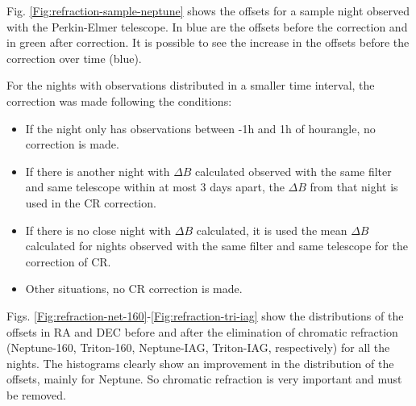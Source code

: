 \documentclass[12pt,a4paper]{report}
\newcommand{\PE}{Perkin-Elmer }
\newcommand{\BC}{Boller \& Chivens }
\begin{document}
Fig. \ref{Fig:refraction-sample-neptune} shows the offsets for a sample night observed with the Perkin-Elmer telescope. In blue are the offsets before the correction and in green after correction. It is possible to see the increase in the offsets before the correction over time (blue).

For the nights with observations distributed in a smaller time interval, the correction was made following the conditions:

\begin{itemize}
\item If the night only has observations between -1h and 1h of hourangle, no correction is made.
\item If there is another night with $\Delta B$ calculated observed with the same filter and same telescope within at most 3 days apart, the $\Delta B$ from that night is used in the CR correction.
\item If there is no close night with $\Delta B$ calculated, it is used the mean $\Delta B$ calculated for nights observed with the same filter and same telescope for the correction of CR.
\item Other situations, no CR correction is made.
\end{itemize}

Figs. \ref{Fig:refraction-net-160}-\ref{Fig:refraction-tri-iag} show the distributions of the offsets in RA and DEC before and after the elimination of chromatic refraction (Neptune-160, Triton-160, Neptune-IAG, Triton-IAG, respectively) for all the nights. The histograms clearly show an improvement in the distribution of the offsets, mainly for Neptune. So chromatic refraction is very important and must be removed. %

\end{document}
